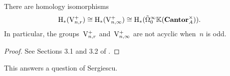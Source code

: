 \begin{corollary}\label{cor:commutator}
There are homology isomorphisms 
\[
\mathrm{H}_*(\mathrm{V}_{n,r}^+)\cong \mathrm{H}_*(\mathrm{V}_{n,\infty}^+)\cong \mathrm{H}_*(\tilde\Omega^\infty_0\mathbb{K}(\mathbf{Cantor}_A^\times)).
\]
In particular, the groups~$\mathrm{V}_{n,r}^+$ and~$\mathrm{V}_{n,\infty}^+$ are not acyclic when~$n$ is odd. 
\end{corollary}
 
\begin{proof}
See Sections 3.1 and 3.2 of \cite{Randal-Williams+Wahl}. 
\end{proof}




This answers a question of Sergiescu.


